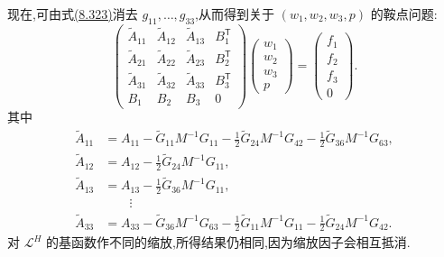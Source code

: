 \begin{note}[方法(8.288)的实现]
现在,可由式\hyperref[eq:vms-coarse-projection-implementation-system]{(8.323)}消去 $g_{11},\ldots,g_{33}$,从而得到关于 $(w_1,w_2,w_3,p)$ 的鞍点问题:
\begin{equation}\label{eq:vms-coarse-projection-condensed-system}
 \begin{pmatrix}
  \widetilde A_{11}&\widetilde A_{12}&\widetilde A_{13}&B_1^{\mathsf T}\\
  \widetilde A_{21}&\widetilde A_{22}&\widetilde A_{23}&B_2^{\mathsf T}\\
  \widetilde A_{31}&\widetilde A_{32}&\widetilde A_{33}&B_3^{\mathsf T}\\
  B_1&B_2&B_3&0
 \end{pmatrix}
 \begin{pmatrix}w_1\\w_2\\w_3\\p\end{pmatrix}
 =\begin{pmatrix}f_1\\f_2\\f_3\\0\end{pmatrix}.
\end{equation}
其中
\begin{align*}
 \widetilde A_{11}&=A_{11}-\widetilde G_{11}M^{-1}G_{11}
   -\tfrac12\widetilde G_{24}M^{-1}G_{42}
   -\tfrac12\widetilde G_{36}M^{-1}G_{63},\\
 \widetilde A_{12}&=A_{12}-\tfrac12\widetilde G_{24}M^{-1}G_{11},\\
 \widetilde A_{13}&=A_{13}-\tfrac12\widetilde G_{36}M^{-1}G_{11},\\[-1mm]
 &\hspace{2em}\vdots\\[-1mm]
 \widetilde A_{33}&=A_{33}-\widetilde G_{36}M^{-1}G_{63}
   -\tfrac12\widetilde G_{11}M^{-1}G_{11}
   -\tfrac12\widetilde G_{24}M^{-1}G_{42}.
\end{align*}
对 $\mathcal L^H$ 的基函数作不同的缩放,所得结果仍相同,因为缩放因子会相互抵消.


\end{note}
